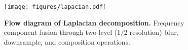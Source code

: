 \begin{figure}[t]
    \centering
    \texttt{[image: figures/lapacian.pdf]}
    \caption{\textbf{Flow diagram of Laplacian decomposition.} Frequency component fusion through two-level ($1/2$ resolution) blur, downsample, and composition operations.}
    \label{fig:lapacian}
\end{figure}